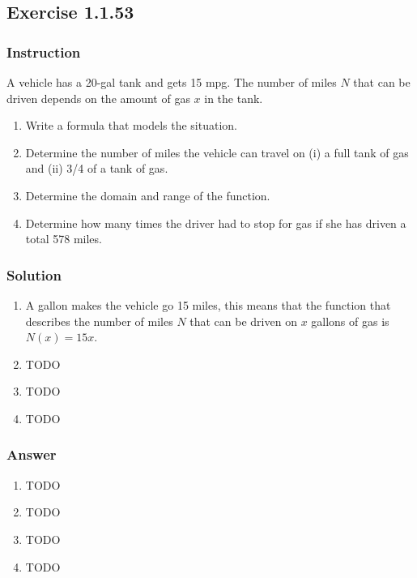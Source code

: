 \subsection*{Exercise 1.1.53}

\subsubsection*{Instruction}

A vehicle has a 20-gal tank and gets 15 mpg. The number of miles $ N $ that can be driven depends on the amount of gas $ x $ in the tank.

\begin{enumerate}[label = (\alph*)]
  \item
    Write a formula that models the situation.
  \item
    Determine the number of miles the vehicle can travel on (i) a full tank of gas and (ii) 3/4 of a tank of gas.
  \item
    Determine the domain and range of the function.
  \item
    Determine how many times the driver had to stop for gas if she has driven a total 578 miles.
\end{enumerate}

\subsubsection*{Solution}

\begin{enumerate}[label = (\alph*)]
  \item
    A gallon makes the vehicle go 15 miles, this means that the function that describes the number of miles $ N $ that can be driven on $ x $ gallons of gas is $ N(x) = 15x $.
  \item
    TODO
  \item
    TODO
  \item
    TODO
\end{enumerate}

\subsubsection*{Answer}

\begin{enumerate}[label = (\alph*)]
  \item
    TODO
  \item
    TODO
  \item
    TODO
  \item
    TODO

\end{enumerate}
